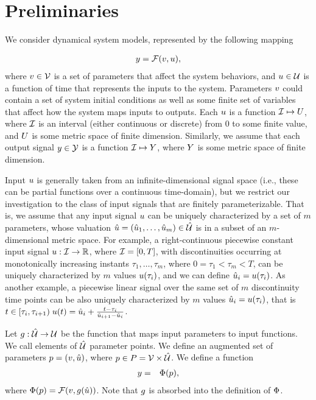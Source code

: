 \section{Preliminaries}

We consider dynamical system models, represented by the following mapping

\begin{eqnarray}
y = \mathcal{F} (v, u),
\end{eqnarray}
where $v \in \mathcal{V}$ is a set of parameters that affect the system behaviors, and $u \in \mathcal{U}$ is a function of time that represents the inputs to the system.
Parameters $v$ could contain a set of system initial conditions as well as some finite set of variables that affect how the system maps inputs to outputs.
Each $u$ is a function $\mathcal{I} \mapsto U$, where $\mathcal{I}$ is an interval (either continuous or discrete) from $0$ to some finite value, and $U$ is some metric space of finite dimension.
Similarly, we assume that each output signal $y \in \mathcal{Y}$ is a function $\mathcal{I} \mapsto Y$, where $Y$ is some metric space of finite dimension.

Input $u$ is generally taken from an infinite-dimensional signal space (i.e., these can be partial functions over a continuous time-domain), but we restrict our investigation to the class of  input signals that are finitely parameterizable. That is, we assume that any input signal $u$ 
can be uniquely characterized by a set of $m$ parameters, whose valuation $\hat{u} =(\hat{u}_1,\ldots,\hat{u}_m) \in \hat{\mathcal{U}}$ is in a subset of an $m$-dimensional metric space. For example, a right-continuous piecewise constant input signal $u:\mathcal{I} \rightarrow \mathbb{R}$, where $\mathcal{I}=[ 0,T ]$, with discontinuities occurring at monotonically increasing instants $\tau_1,\ldots, \tau_m$, where $0=\tau_1<\tau_m<T$, can be uniquely characterized by $m$ values $u(\tau_i)$, and we can define $\hat{u}_i=u(\tau_i)$. As another example, a piecewise linear signal over the same set of $m$ discontinuity time points can be also uniquely characterized by $m$ values $\hat{u}_i = u(\tau_i)$, that is $t \in [\tau_i, \tau_{i+1}) \;  u(t) = \hat{u}_i  + \frac{t -  \tau_i}{\hat{u}_{i+1} - \hat{u}_i}$.

Let $g:\hat{\mathcal{U}} \rightarrow \mathcal{U}$ be the function that maps input parameters to input functions. We call elements of $\hat{\mathcal{U}}$ parameter points. We define an augmented set of parameters $p = (v, \hat{u})$, where $p\in P = \mathcal{V} \times \hat{\mathcal{U}}$.
We define a function 
\begin{eqnarray} \label{eq:behaviorfunc}
y &=& \Phi(p),
\end{eqnarray}
where $\Phi(p) = \mathcal{F} (v, g(\hat{u}))$.
Note that $g$ is absorbed into the definition of $\Phi$.


